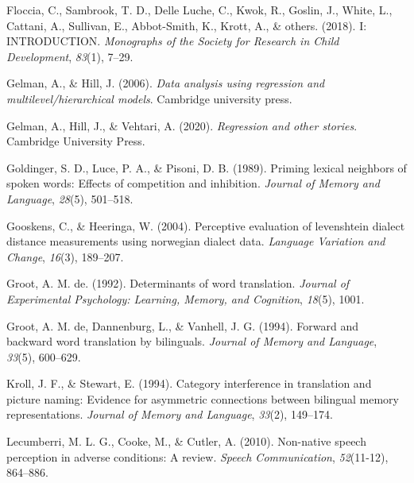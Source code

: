 \documentclass[
  english,
  man,floatsintext]{apa7}
\newlength{\cslhangindent}
\newenvironment{CSLReferences}[2] %
 {%
  \setlength{\parindent}{0pt}
  \ifodd #1 \everypar{\setlength{\hangindent}{\cslhangindent}}\ignorespaces\fi
  \ifnum #2 > 0
  \setlength{\parskip}{#2\baselineskip}
  \fi
 }%
 {}
\begin{document}
\begin{CSLReferences}{1}{0}
\leavevmode{}%
Floccia, C., Sambrook, T. D., Delle Luche, C., Kwok, R., Goslin, J., White, L., Cattani, A., Sullivan, E., Abbot-Smith, K., Krott, A., \& others. (2018). I: INTRODUCTION. \emph{Monographs of the Society for Research in Child Development}, \emph{83}(1), 7--29.

\leavevmode{}%
Gelman, A., \& Hill, J. (2006). \emph{Data analysis using regression and multilevel/hierarchical models}. Cambridge university press.

\leavevmode{}%
Gelman, A., Hill, J., \& Vehtari, A. (2020). \emph{Regression and other stories}. Cambridge University Press.

\leavevmode{}%
Goldinger, S. D., Luce, P. A., \& Pisoni, D. B. (1989). Priming lexical neighbors of spoken words: Effects of competition and inhibition. \emph{Journal of Memory and Language}, \emph{28}(5), 501--518.

\leavevmode{}%
Gooskens, C., \& Heeringa, W. (2004). Perceptive evaluation of levenshtein dialect distance measurements using norwegian dialect data. \emph{Language Variation and Change}, \emph{16}(3), 189--207.

\leavevmode{}%
Groot, A. M. de. (1992). Determinants of word translation. \emph{Journal of Experimental Psychology: Learning, Memory, and Cognition}, \emph{18}(5), 1001.

\leavevmode{}%
Groot, A. M. de, Dannenburg, L., \& Vanhell, J. G. (1994). Forward and backward word translation by bilinguals. \emph{Journal of Memory and Language}, \emph{33}(5), 600--629.

\leavevmode{}%
Kroll, J. F., \& Stewart, E. (1994). Category interference in translation and picture naming: Evidence for asymmetric connections between bilingual memory representations. \emph{Journal of Memory and Language}, \emph{33}(2), 149--174.

\leavevmode{}%
Lecumberri, M. L. G., Cooke, M., \& Cutler, A. (2010). Non-native speech perception in adverse conditions: A review. \emph{Speech Communication}, \emph{52}(11-12), 864--886.


\end{CSLReferences}
\end{document}
